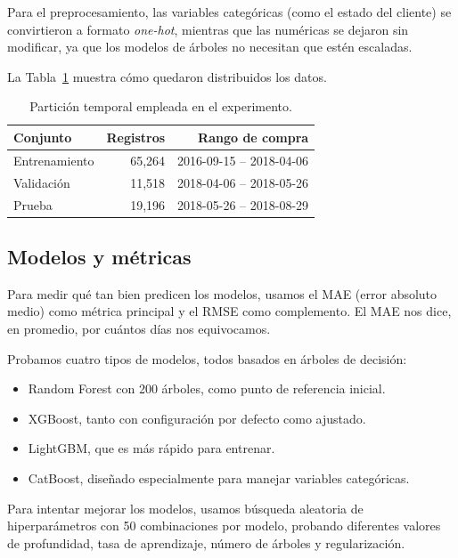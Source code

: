 \documentclass[journal]{IEEEtran}
\begin{document}
Para el preprocesamiento, las variables categóricas (como el estado del cliente) se convirtieron a formato \textit{one-hot}, mientras que las numéricas se dejaron sin modificar, ya que los modelos de árboles no necesitan que estén escaladas.

La Tabla~\ref{tab:particion} muestra cómo quedaron distribuidos los datos.

\begin{table}[H]
	\centering
	\caption{Partición temporal empleada en el experimento.}
	\label{tab:particion}
	\begin{tabular}{lrr}
		\hline
		Conjunto      & Registros & Rango de compra          \\
		\hline
		Entrenamiento & 65{,}264  & 2016-09-15 -- 2018-04-06 \\
		Validación    & 11{,}518  & 2018-04-06 -- 2018-05-26 \\
		Prueba        & 19{,}196  & 2018-05-26 -- 2018-08-29 \\
		\hline
	\end{tabular}
\end{table}

\subsection{Modelos y métricas}

Para medir qué tan bien predicen los modelos, usamos el MAE (error absoluto medio) como métrica principal y el RMSE como complemento. El MAE nos dice, en promedio, por cuántos días nos equivocamos.

Probamos cuatro tipos de modelos, todos basados en árboles de decisión:
\begin{itemize}
	\item Random Forest con 200 árboles, como punto de referencia inicial.
	\item XGBoost, tanto con configuración por defecto como ajustado.
	\item LightGBM, que es más rápido para entrenar\cite{ke2017lightgbm}.
	\item CatBoost, diseñado especialmente para manejar variables categóricas\cite{prokhorenkova2018catboost}.
\end{itemize}

Para intentar mejorar los modelos, usamos búsqueda aleatoria de hiperparámetros con 50 combinaciones por modelo, probando diferentes valores de profundidad, tasa de aprendizaje, número de árboles y regularización.
\end{document}
